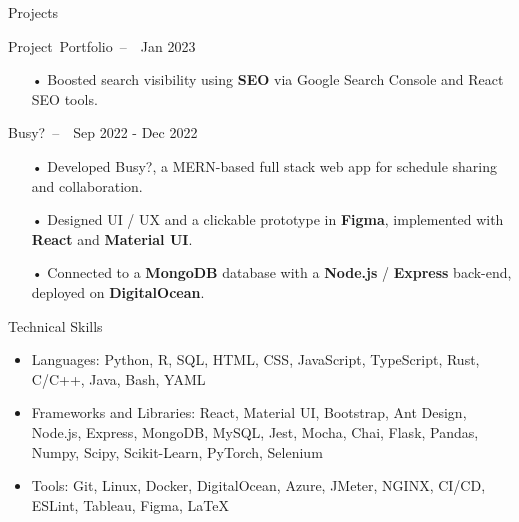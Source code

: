 \documentclass[]{mcdowellcv}
\begin{document}
\begin{cvsection}{Projects}
\begin{cvsubsection}{\mbox{Project Portfolio -- 										 \hspace{-0.2cm}
					 		 \mdseries\itshape{}
					 		 }}{}{Jan 2023}
\begin{itemize}
	\item[•]Boosted search visibility using \textbf{SEO} via Google Search Console and React SEO tools.
\end{itemize}
			\end{cvsubsection}
			\vspace{-0.2cm}
		\begin{cvsubsection}{\mbox{Busy? --
							 \hspace{-0.2cm}
					 		 \mdseries\itshape{}
					 		 }}{}{Sep 2022 - Dec 2022}
			\begin{itemize}
				\item[•] Developed Busy?, a MERN-based full stack web app for schedule sharing and collaboration.
				\item[•] Designed UI / UX and a clickable prototype in \textbf{Figma}, implemented with \textbf{React} and \textbf{Material UI}.
				\item[•] Connected to a \textbf{MongoDB} database with a \textbf{Node.js} / \textbf{Express} back-end, deployed on \textbf{DigitalOcean}.
				\end{itemize}
				\end{cvsubsection}
	\end{cvsection}
	
	\vspace{-0.25cm}
		
	\begin{cvsection}{Technical Skills}
		\begin{cvsubsection}{}{}{}	
			\begin{itemize}
				\item Languages: Python, R, SQL, HTML, CSS, JavaScript, TypeScript, Rust, C/C++, Java, Bash, YAML
				\item Frameworks and Libraries: React, Material UI, Bootstrap, Ant Design, Node.js, Express, MongoDB, MySQL, Jest, Mocha, Chai, Flask, Pandas, Numpy, Scipy, Scikit-Learn, PyTorch, Selenium
				\item Tools: Git, Linux, Docker, DigitalOcean, Azure, JMeter, NGINX, CI/CD, ESLint, Tableau, Figma, \LaTeX
			\end{itemize}
		\end{cvsubsection}
	\end{cvsection}
	
\end{document}
